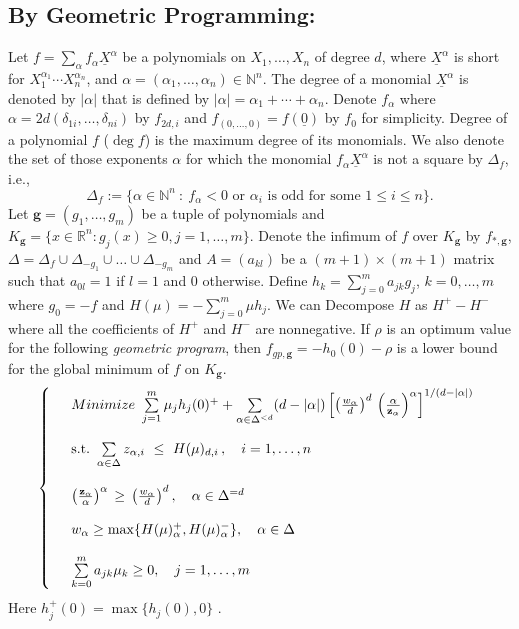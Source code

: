 \documentclass{amsart}
\theoremstyle{definition}
\newcommand{\reals}{\mathbb{R}}
\newcommand{\naturals}{\mathbb{N}}
\newcommand{\ux}{\underline{X}}
\begin{document}
\subsection{By Geometric Programming:}
Let $f=\sum_{\alpha}f_{\alpha}\ux^{\alpha}$ be a polynomials on $X_1,\dots, X_n$ of degree $d$, where $\ux^{\alpha}$ is short for 
$X_1^{\alpha_1}\cdots X_n^{\alpha_n}$, and $\alpha=(\alpha_1,\dots,\alpha_n)\in\naturals^n$. 
The degree of a monomial $\ux^{\alpha}$ is denoted by $|\alpha|$ that is defined by $|\alpha|=\alpha_1+\cdots+\alpha_n$. 
Denote $f_{\alpha}$ where $\alpha=2d(\delta_{1i},\dots,\delta_{ni})$ by $f_{2d,i}$ and $f_{(0,\dots,0)}=f(\underline{0})$ by $f_0$ for simplicity.
Degree of a polynomial $f$ ($\deg f$) is the maximum degree of its monomials.
We also denote the set of those exponents $\alpha$ for which the monomial $f_{\alpha}\ux^{\alpha}$ is not a square by $\Delta_f$, i.e.,
\[
    \Delta_f:=\{\alpha\in\naturals^n ~:~ f_{\alpha}<0\textrm{ or }\alpha_i\textrm{ is odd for some }1\leq i\leq n\}.
\]
Let $\textbf{g}=(g_1,\dots,g_m)$ be a tuple of polynomials and $K_{\textbf{g}}=\{x\in\reals^n : g_j(x)\ge 0, j=1,\dots,m\}$. Denote the infimum 
of $f$ over $K_{\textbf{g}}$ by $f_{*,\textbf{g}}$, $\Delta=\Delta_f\cup\Delta_{-g_1}\cup\dots\cup\Delta_{-g_m}$ and $A=(a_{kl})$ be a 
$(m+1)\times(m+1)$ matrix such that $a_{0l}=1$ if $l=1$ and $0$ otherwise. Define $h_k=\sum_{j=0}^m a_{jk}g_j$, $k=0,\dots,m$ where $g_0=-f$ and
$H(\mu)=-\sum_{j=0}^m \mu h_j$. We can Decompose $H$ as $H^+-H^-$ where all the coefficients of $H^+$ and $H^-$ are nonnegative.
If $\rho$ is an optimum value for the following \textit{geometric program}, then $f_{gp,\textbf{g}}=-h_0(0)-\rho$ is a lower bound for the global 
minimum of $f$ on $K_{\textbf{g}}$.
\begin{equation}\label{GP}
\left\{\begin{array}{rl}
&Minimize \ \sum\limits_{j=1}^m \mu_jh_j(0)^++ \sum\limits_{\alpha\in\Delta^{<d}}(d-\vert\alpha\vert)\left[
\left(\frac{w_\alpha}{d}\right)^{d}\,\left(\frac{\alpha}{\bold{z}_\alpha}\right)^\alpha
\right]^{1/(d-\vert\alpha\vert)}\\
&\\
&\mbox{s.t.}\ \sum\limits_{\alpha\in\Delta}z_{\alpha,i} \ \le \ H(\mu)_{d,i}\,,\quad i=1,\ldots,n\\
&\\
&\left(\frac{\bold{z}_\alpha}{\alpha}\right)^\alpha \,\ge \,\left(\frac{w_\alpha}{d}\right)^{d},\quad\alpha\in\Delta^{=d} \\
&\\
&w_{\alpha}\ge \max\{ H(\mu)_{\alpha}^+, H(\mu)_{\alpha}^-\}, \quad\alpha \in \Delta \\
&\\
&\sum\limits_{k=0}^m a_{jk}\mu_k \ge 0, \quad j=1,\dots,m
\end{array}\right.
\end{equation}
Here $h_j^+(0)=\max\{h_j(0),0\}$ \cite[Theorem 4.1]{genlbgp}.
\end{document}

